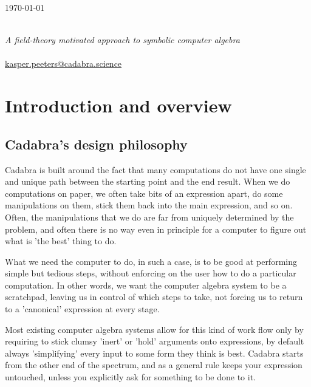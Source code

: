 \documentclass[11pt]{book}
\begin{document}
\pagestyle{empty}
\begin{flushright}
\today
\end{flushright}
\vspace{6ex}
{\bf {}}~\\[.8ex] 
{\it\large A field-theory motivated approach to symbolic computer algebra}\\[6ex]
{\bf {}}
\newpage
\pagestyle{empty}
\hbox{~}
\vfill
{}\\[3ex]
\href{mailto:kasper.peeters@cadabra.science}{kasper.peeters@cadabra.science}

\tableofcontents

\pagestyle{fancy} 

\chapter{Introduction and overview}
\section{Cadabra's design philosophy}

Cadabra is built around the fact that many computations do not have
one single and unique path between the starting point and the end
result. When we do computations on paper, we often take bits of an
expression apart, do some manipulations on them, stick them back into
the main expression, and so on. Often, the manipulations that we do
are far from uniquely determined by the problem, and often there is no
way even in principle for a computer to figure out what is 'the best'
thing to do.

What we need the computer to do, in such a case, is to be good at
performing simple but tedious steps, without enforcing on the user how
to do a particular computation. In other words, we want the computer
algebra system to be a scratchpad, leaving us in control of which
steps to take, not forcing us to return to a 'canonical' expression at
every stage.

Most existing computer algebra systems allow for this kind of work
flow only by requiring to stick clumsy 'inert' or 'hold' arguments
onto expressions, by default always 'simplifying' every input to some
form they think is best. Cadabra starts from the other end of the
spectrum, and as a general rule keeps your expression untouched,
unless you explicitly ask for something to be done to it.
\end{document}
